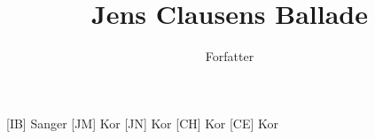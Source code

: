 \documentclass[a4paper,11pt]{article}
\title{Jens Clausens Ballade}
\author{Forfatter}
\begin{document}
\maketitle

\begin{roles}
[IB] Sanger
[JM] Kor
[JN] Kor
[CH] Kor
[CE] Kor
\end{roles}

\begin{song}


\end{song}
\end{document}
